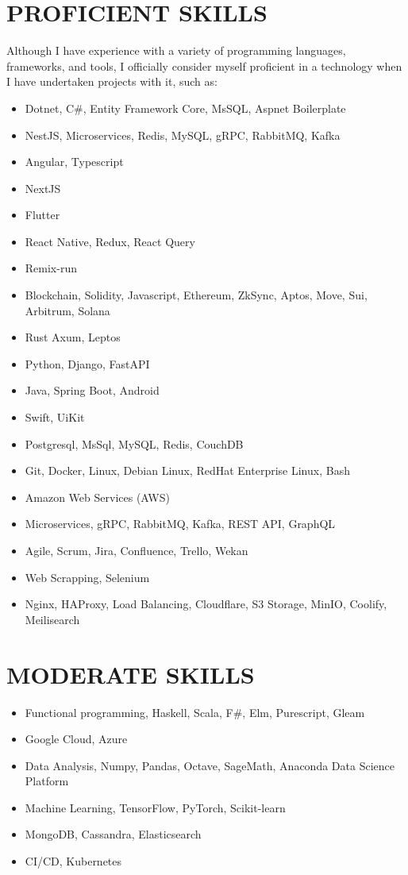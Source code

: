 \documentclass[line,margin]{res}
\begin{document}
\begin{resume}
\noindent\hrulefill
\section{\textbf{PROFICIENT SKILLS}} Although I have experience with a variety of programming languages, frameworks, and tools, I officially consider myself proficient in a technology when I have undertaken projects with it, such as:
\begin{itemize}
\item Dotnet, C\#, Entity Framework Core, MsSQL, Aspnet Boilerplate
\item NestJS, Microservices, Redis, MySQL, gRPC, RabbitMQ, Kafka
\item Angular, Typescript
\item NextJS
\item Flutter
\item React Native, Redux, React Query
\item Remix-run
\item Blockchain, Solidity, Javascript, Ethereum, ZkSync, Aptos, Move, Sui, Arbitrum, Solana
\item Rust Axum, Leptos
\item Python, Django, FastAPI
\item Java, Spring Boot, Android
\item Swift, UiKit
\item Postgresql, MsSql, MySQL, Redis, CouchDB 
\item Git, Docker, Linux, Debian Linux, RedHat Enterprise Linux, Bash
\item Amazon Web Services (AWS)
\item Microservices, gRPC, RabbitMQ, Kafka, REST API, GraphQL
\item Agile, Scrum, Jira, Confluence, Trello, Wekan
\item Web Scrapping, Selenium
\item Nginx, HAProxy, Load Balancing, Cloudflare, S3 Storage, MinIO, Coolify, Meilisearch
\end{itemize}

\noindent\hrulefill
\section{\textbf{MODERATE SKILLS}}
\begin{itemize}
        \item Functional programming, Haskell, Scala, F\#, Elm, Purescript, Gleam
        \item Google Cloud, Azure
        \item Data Analysis, Numpy, Pandas, Octave, SageMath, Anaconda Data Science Platform
        \item Machine Learning, TensorFlow, PyTorch, Scikit-learn
        \item MongoDB, Cassandra, Elasticsearch
        \item CI/CD, Kubernetes
\end{itemize}
 

\end{resume}
\end{document}
